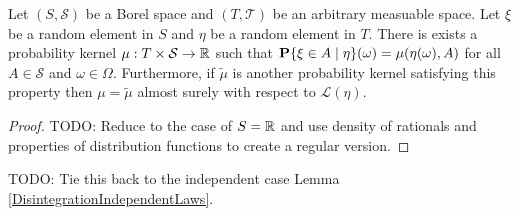 \begin{thm}\label{ExistenceConditionalDistribution}Let $(S, \mathcal{S})$ be a Borel space and
  $(T, \mathcal{T})$ be an arbitrary measuable space.  Let $\xi$ be a
  random element in $S$ and $\eta$ be a random element in $T$.  There
  is exists a probability kernel $\mu : T \times \mathcal{S} \to
  \mathbb{R}$ such that $\textbf{P}\{\xi \in A \mid \eta \}(\omega) =
  \mu(\eta(\omega), A)$ for all $A \in \mathcal{S}$ and $\omega \in
  \Omega$.  Furthermore, if $\tilde{\mu}$ is another probability
  kernel satisfying this property then $\mu = \tilde{\mu}$ almost
  surely with respect to $\mathcal{L}(\eta)$.
\end{thm}
\begin{proof}
TODO:  Reduce to the case of $S = \mathbb{R}$ and use density of rationals
and properties of distribution functions to create a regular version.
\end{proof}

TODO:  Tie this back to the independent case
Lemma \ref{DisintegrationIndependentLaws}.

